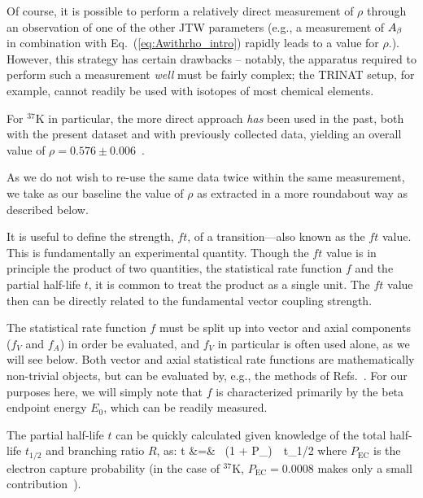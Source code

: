 Of course, it is possible to perform a relatively direct measurement of $\rho$ through an observation of one of the other \ac{JTW} parameters (e.g., a measurement of $A_{\beta}$ in combination with Eq.~(\ref{eq:Awithrho_intro}) rapidly leads to a value for $\rho$.).  However, this strategy has certain drawbacks -- notably, the apparatus required to perform such a measurement \emph{well} must be fairly complex;  the TRINAT setup, for example, cannot readily be used with isotopes of most chemical elements.  

For $^{37}$K in particular, the more direct approach \emph{has} been used in the past, both with the present dataset and with previously collected data, yielding an overall value of $\rho=0.576 \pm 0.006$~\cite{ben_Abeta}\cite{shidling2014}\cite{dan_Bnu}.

As we do not wish to re-use the same data twice within the same measurement, we take as our baseline the value of $\rho$ as extracted in a more roundabout way as described below.


It is useful to define the strength, $ft$, of a transition---also known as the $ft$ value.  This is fundamentally an experimental quantity.  Though the $ft$ value is in principle the product of two quantities, the statistical rate function $f$ and the partial half-life $t$, it is common to treat the product as a single unit.  The $ft$ value then can be directly related to the fundamental vector coupling strength.  

The statistical rate function $f$ must be split up into vector and axial components ($f_V$ and $f_A$) in order be evaluated, and $f_V$ in particular is often used alone, as we will see below.  Both vector and axial statistical rate functions are mathematically non-trivial objects\cite{towner_hardy_1995_frombook}\cite{HardyTowner2005_Superallowed}, but can be evaluated by, e.g., the methods of Refs.~\cite{wilkinson2}\cite{wilkinson3}\cite{wilkinson4}.  For our purposes here, we will simply note that $f$ is characterized primarily by the beta endpoint energy $E_0$, which can be readily measured.  

The partial half-life $t$ can be quickly calculated given knowledge of the total half-life $t_{1/2}$ and branching ratio $R$, as:
\bea
t &=&   \, (1 + P_{}) \,\, t_{1/2}
\eea
where $P_{\mathrm{EC}}$ is the electron capture probability (in the case of $^{37}$K, $P_{\mathrm{EC}}=0.0008$ makes only a small contribution~\cite{SeverijnsTandecki2008}).

